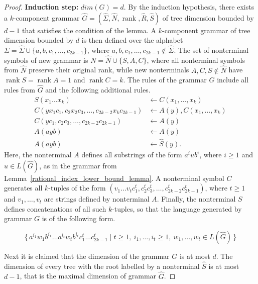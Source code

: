 \documentclass[runningheads]{llncs}
\newcommand{\set}[2]{\{ \, #1 \mid #2 \, \}}
\newcommand{\ranksymb}{\mathop{\mathrm{rank}}}
\newcommand{\rank}[1]{\ranksymb #1}
\begin{document}
\begin{proof}
\textbf{Induction step:} $dim(G) = d$.
By the induction hypothesis, there exists a $k$-component grammar
$\hat{G}=(\widehat{\Sigma}, \widehat{N}, \ranksymb, \widehat{R}, \widehat{S})$
of tree dimension bounded by $d-1$
that satisfies the condition of the lemma.
A $k$-component grammar of tree dimension bounded by $d$ is then defined
over the alphabet $\Sigma = \widehat{\Sigma} \cup \{a, b, c_1, \ldots, c_{2k-1}\}$,
where $a, b, c_1, \ldots, c_{2k-1} \not\in \widehat{\Sigma}$.
The set of nonterminal symbols of new grammar is $N = \widehat{N} \cup \{S, A, C\}$,
where all nonterminal symbols from $\widehat{N}$ preserve their original rank,
while new nonterminals $A, C, S \not\in \widehat{N}$
have $\rank{S}=\rank{A}=1$ and $\rank{C}=k$.
The rules of the grammar $G$ include all rules from $\widehat{G}$ and the following additional rules.
\begin{align*}
	S(x_1 \ldots x_k) &\gets C(x_1, \ldots, x_k) \\
	C(yx_1c_1, c_2 x_2 c_3, \ldots, c_{2k-2}x_kc_{2k-1}) &\gets A(y), C(x_1, \ldots, x_k) \\
	C(y c_1, c_2 c_3, \ldots, c_{2k-2} c_{2k-1}) &\gets A(y) \\
	A(ayb) &\gets A(y) \\
	A(ayb) &\gets \widehat{S}(y).
\end{align*}
Here, the nonterminal $A$ defines all substrings of the form $a^i u b^i$, where 
$i \geqslant 1$ and $u \in L(\widehat{G})$, as in the grammar from Lemma~\ref{rational_index_lower_bound_lemma}.
A nonterminal symbol $C$ generates all $k$-tuples of the form 
$(v_1 \ldots v_t c_1^t, c_2^t c_3^t, \ldots, c_{2k-2}^t c_{2k-1}^t)$, where 
$t \geqslant 1$ and $v_1, \ldots, v_t$ are strings defined by nonterminal $A$.
Finally, the nonterminal $S$ defines concatenations of all such $k$-tuples, so that the language 
generated by grammar $G$ is of the following form.

\begin{equation*}
	\set{a^{i_1} w_1 b^{i_1} \ldots a^{i_t} w_t b^{i_t} c_1^t \ldots c_{2k-1}^t}{t \geqslant 1, \:
		i_1, \ldots, i_t \geqslant 1, \:
		w_1, \ldots, w_t \in L(\widehat{G})}
\end{equation*}

Next it is claimed that the dimension of the grammar $G$ is at most $d$.
The dimension of every tree with the root labelled by a nonterminal $\widehat{S}$
is at most $d-1$, that is the maximal dimension of grammar $\widehat{G}$.


\end{proof}
\end{document}

